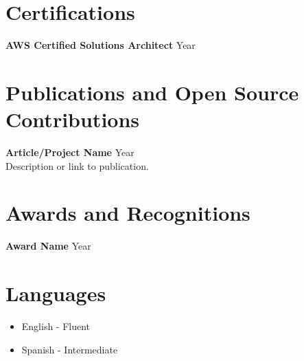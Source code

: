\documentclass[a4paper,10pt]{article}
\begin{document}
\section*{Certifications}
\textbf{AWS Certified Solutions Architect} \hfill Year

\section*{Publications and Open Source Contributions}
\textbf{Article/Project Name} \hfill Year\\
Description or link to publication.

\section*{Awards and Recognitions}
\textbf{Award Name} \hfill Year

\section*{Languages}
\begin{itemize}
    \item English - Fluent
    \item Spanish - Intermediate
\end{itemize}
\end{document}
